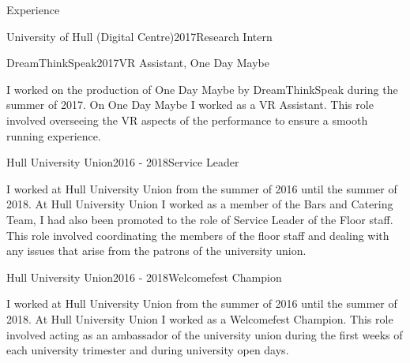 \documentclass{cv}
\begin{document}
\begin{rSection}{Experience}
\begin{rSubsection}{University of Hull (Digital Centre)}{2017}{Research Intern}{}
\end{rSubsection}


\begin{rSubsection}{DreamThinkSpeak}{2017}{VR Assistant, One Day Maybe}{}

\item I worked on the production of One Day Maybe by DreamThinkSpeak during the summer of 2017. On One Day Maybe I worked as a VR Assistant. This role involved overseeing the VR aspects of the performance to ensure a smooth running experience.

\end{rSubsection}


\begin{rSubsection}{Hull University Union}{2016 - 2018}{Service Leader}{}

\item I worked at Hull University Union from the summer of 2016 until the summer of 2018. At Hull University Union I worked as a member of the Bars and Catering Team, I had also been promoted to the role of Service Leader of the Floor staff. This role involved coordinating the members of the floor staff and dealing with any issues that arise from the patrons of the university union.

\end{rSubsection}


\begin{rSubsection}{Hull University Union}{2016 - 2018}{Welcomefest Champion}{}

\item I worked at Hull University Union from the summer of 2016 until the summer of 2018. At Hull University Union I worked as a Welcomefest Champion. This role involved acting as an ambassador of the university union during the first weeks of each university trimester and during university open days.

\end{rSubsection}

\end{rSection}

\end{document}
